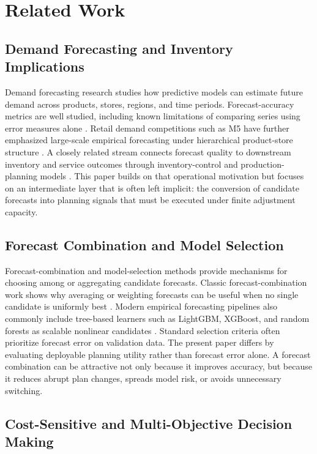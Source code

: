 \section{Related Work}

\subsection{Demand Forecasting and Inventory Implications}

Demand forecasting research studies how predictive models can estimate future demand across products, stores, regions, and time periods. Forecast-accuracy metrics are well studied, including known limitations of comparing series using error measures alone \citep{hyndman2006accuracy}. Retail demand competitions such as M5 have further emphasized large-scale empirical forecasting under hierarchical product-store structure \citep{makridakis2022m5}. A closely related stream connects forecast quality to downstream inventory and service outcomes through inventory-control and production-planning models \citep{silver1998inventory,axsater2015inventory}. This paper builds on that operational motivation but focuses on an intermediate layer that is often left implicit: the conversion of candidate forecasts into planning signals that must be executed under finite adjustment capacity.

\subsection{Forecast Combination and Model Selection}

Forecast-combination and model-selection methods provide mechanisms for choosing among or aggregating candidate forecasts. Classic forecast-combination work shows why averaging or weighting forecasts can be useful when no single candidate is uniformly best \citep{bates1969combination}. Modern empirical forecasting pipelines also commonly include tree-based learners such as LightGBM, XGBoost, and random forests as scalable nonlinear candidates \citep{ke2017lightgbm,chen2016xgboost,breiman2001random}. Standard selection criteria often prioritize forecast error on validation data. The present paper differs by evaluating deployable planning utility rather than forecast error alone. A forecast combination can be attractive not only because it improves accuracy, but because it reduces abrupt plan changes, spreads model risk, or avoids unnecessary switching.

\subsection{Cost-Sensitive and Multi-Objective Decision Making}

